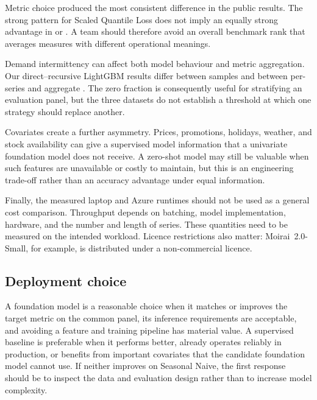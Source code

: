 Metric choice produced the most consistent difference in the public results.
The strong pattern for Scaled Quantile Loss does not imply an equally strong
advantage in \WAPE{} or \MASE{}. A team should therefore avoid an overall
benchmark rank that averages measures with different operational meanings.

Demand intermittency can affect both model behaviour and metric aggregation.
Our direct--recursive LightGBM results differ between samples and between
per-series and aggregate \WAPE{}. The zero fraction is consequently useful for
stratifying an evaluation panel, but the three datasets do not establish a
threshold at which one strategy should replace another.

Covariates create a further asymmetry. Prices, promotions, holidays, weather,
and stock availability can give a supervised model information that a
univariate foundation model does not receive. A zero-shot model may still be
valuable when such features are unavailable or costly to maintain, but this is
an engineering trade-off rather than an accuracy advantage under equal
information.

Finally, the measured laptop and Azure runtimes should not be used as a general
cost comparison. Throughput depends on batching, model implementation,
hardware, and the number and length of series. These quantities need to be
measured on the intended workload. Licence restrictions also matter:
Moirai~2.0-Small, for example, is distributed under a non-commercial licence.

\subsection{Deployment choice}
\label{subsec:framework-decision-rule}

A foundation model is a reasonable choice when it matches or improves the
target metric on the common panel, its inference requirements are acceptable,
and avoiding a feature and training pipeline has material value. A supervised
baseline is preferable when it performs better, already operates reliably in
production, or benefits from important covariates that the candidate
foundation model cannot use. If neither improves on Seasonal Naive, the first
response should be to inspect the data and evaluation design rather than to
increase model complexity.
